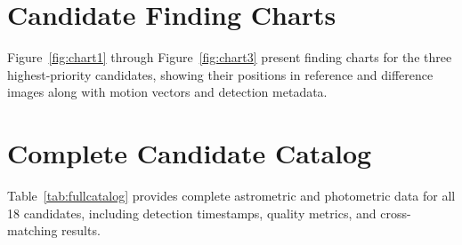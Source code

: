 \documentclass[twocolumn]{aastex631}
\begin{document}



\appendix

\section{Candidate Finding Charts} \label{app:charts}

Figure~\ref{fig:chart1} through Figure~\ref{fig:chart3} present finding charts for the three highest-priority candidates, showing their positions in reference and difference images along with motion vectors and detection metadata.

\section{Complete Candidate Catalog} \label{app:catalog}

Table~\ref{tab:fullcatalog} provides complete astrometric and photometric data for all 18 candidates, including detection timestamps, quality metrics, and cross-matching results.
\end{document}
